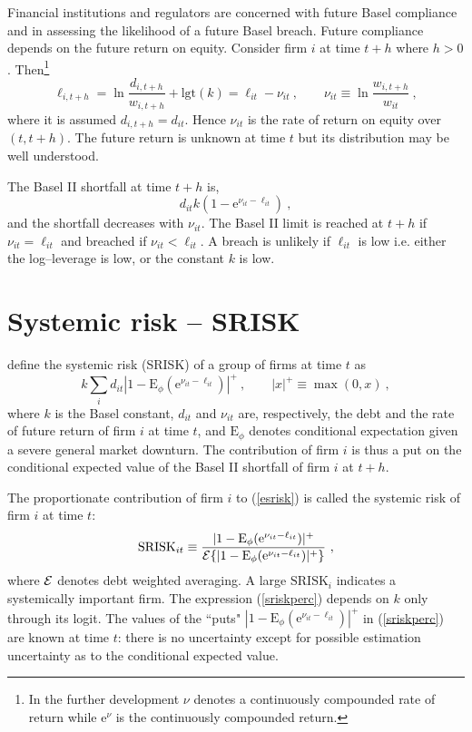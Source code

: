 \documentclass[authoryear]{elsarticle}
\newcommand{\logit}{\mathrm{lgt}}
\newcommand{\E}{\mathrm{E}}
\newcommand{\e}{\mathrm{e}}
\newcommand{\Ex}{{\cal E}}
\newcommand{\eref}[1]{(\ref{#1})}
\newcommand{\cq}{\ , \qquad}
\newcommand{\be}[1]{\begin{equation}\label{#1}}
\newcommand{\ee}{\end{equation}}
\begin{document}
Financial institutions and regulators are concerned with future Basel compliance and in assessing  the likelihood of a  future Basel breach.   Future compliance depends on the future return on equity.   Consider  firm $i$ at time  $t+h$ where $h>0$.  Then\footnote{In the further development $\nu$  denotes a continuously compounded rate of return while $\e^\nu$ is the continuously compounded return.}
$$
\ell_{i,t+h} = \ln \frac{d_{i,t+h}}{w_{i,t+h}} +\logit(k)= \ell_{it} -\nu_{it}\cq \nu_{it}\equiv \ln\frac{w_{i,t+h}}{w_{it}}  \ ,
$$
where it is assumed $d_{i,t+h}=d_{it}$.  Hence $\nu_{it}$ is the rate of return on equity over $(t,t+h)$.  The future return is unknown at time $t$ but its distribution may be  well understood.

The  Basel II shortfall  at time $t+h$ is,
\be{bs}
d_{it}k(1-\e^{\nu_{it}-\ell_{it}})\ , 
\ee
and the shortfall decreases with  $\nu_{it}$. 
The Basel II limit is reached at $t+h$ if $\nu_{it}=\ell_{it}$ and  breached  if
$
\nu_{it}< \ell_{it}
$.
A breach is  unlikely if $\ell_{it}$ is low i.e. either the log--leverage is low, or the  constant $k$ is low.
\newcommand{\Es}{\E_\phi}





\section{Systemic risk -- SRISK}

\cite{brownlees2015} define the systemic risk (SRISK) of a group of firms  at time $t$ as
\be{esrisk}
k\sum_i d_{it}|1-\Es(\e^{\nu_{it}-\ell_{it}})|^+  \cq |x|^+\equiv \max(0,x)\ ,
\ee
where $k$ is the Basel constant, $d_{it}$  and $\nu_{it}$ are, respectively,  the debt and the rate of  future return  of firm $i$ at time $t$,  and $\Es$ denotes  conditional expectation given a severe general market downturn.
The contribution of firm $i$ is thus a put on the conditional expected value of the Basel II shortfall of firm $i$ at $t+h$.

 The proportionate contribution of firm $i$  to \eref{esrisk} is called the systemic risk of firm $i$ at time $t$:
 \be{sriskperc}
 \mathrm{SRISK}_{it}\equiv\frac{|1-\Es(\e^{\nu_{it}-\ell_{it}})|^+}{\Ex\{|1-\Es(\e^{\nu_{it}-\ell_{it}})|^+\}}\ , 
 \ee
where $\Ex$ denotes  debt weighted averaging.     A large $\mathrm{SRISK}_i$ indicates a systemically important firm.  The  expression \eref{sriskperc} depends on $k$ only through its logit.  The values of the ``puts" $|1-\Es(\e^{\nu_{it}-\ell_{it}})|^+$  in \eref{sriskperc} are known at time $t$:  there is no uncertainty except for possible estimation uncertainty as to the conditional  expected value.
\end{document}
